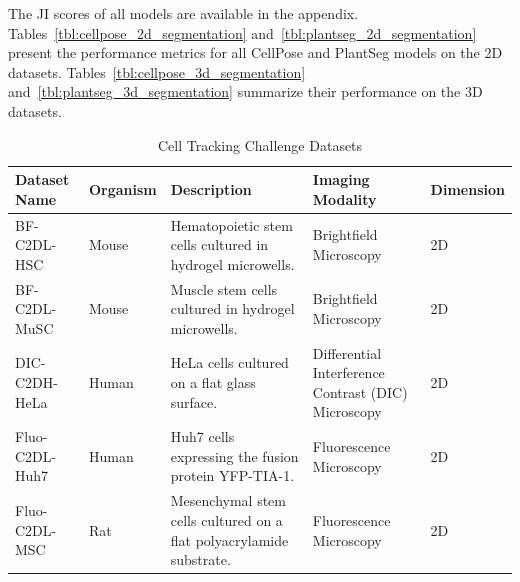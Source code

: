 \documentclass[./dissertation.tex]{subfiles}
\begin{document}
The JI scores of all models are available in the appendix. Tables~\ref{tbl:cellpose_2d_segmentation} and~\ref{tbl:plantseg_2d_segmentation} present the performance metrics for all CellPose and PlantSeg models on the 2D datasets. Tables~\ref{tbl:cellpose_3d_segmentation} and~\ref{tbl:plantseg_3d_segmentation} summarize their performance on the 3D datasets.

\begin{table}[!ht]
    \centering
    \caption{Cell Tracking Challenge Datasets}
    \label{tbl:ctc_datasets}
    \renewcommand{\arraystretch}{1.3} %
    \small %
    \begin{tabular}{|l|p{2.3cm}|p{5cm}|p{2.3cm}|p{2.3cm}|}
        \hline
        \textbf{Dataset Name} & \textbf{Organism}       & \textbf{Description}                                                                                                        & \textbf{Imaging Modality}                           & \textbf{Dimension} \\ \hline
        BF-C2DL-HSC           & Mouse                   & Hematopoietic stem cells cultured in hydrogel microwells.                                                                   & Brightfield Microscopy                              & 2D                 \\ \hline
        BF-C2DL-MuSC          & Mouse                   & Muscle stem cells cultured in hydrogel microwells.                                                                          & Brightfield Microscopy                              & 2D                 \\ \hline
        DIC-C2DH-HeLa         & Human                   & HeLa cells cultured on a flat glass surface.                                                                                & Differential Interference Contrast (DIC) Microscopy & 2D                 \\ \hline
        Fluo-C2DL-Huh7        & Human                   & Huh7 cells expressing the fusion protein YFP-TIA-1.                                                                         & Fluorescence Microscopy                             & 2D                 \\ \hline
        Fluo-C2DL-MSC         & Rat                     & Mesenchymal stem cells cultured on a flat polyacrylamide substrate.                                                         & Fluorescence Microscopy                             & 2D                 \\ \hline

\end{tabular}
\end{table}
\end{document}
